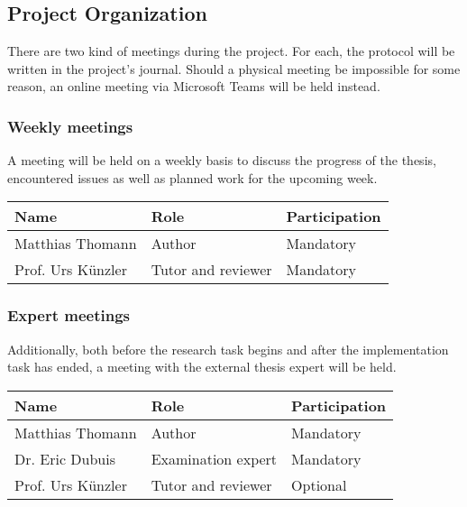 \subsection{Project Organization}
There are two kind of meetings during the project. For each, the protocol will be written in the project's journal.
Should a physical meeting be impossible for some reason, an online meeting via Microsoft Teams will be held instead.

\subsubsection{Weekly meetings}
A meeting will be held on a weekly basis to discuss the progress of the thesis, encountered issues as well as planned work for the upcoming week.
\emptyline
\noindent\begin{tabular}{|l|l|l|}
    \hline
    \textbf{Name}       & \textbf{Role}         & \textbf{Participation}\\ \hline
    Matthias Thomann    & Author                & Mandatory             \\ \hline
    Prof. Urs Künzler   & Tutor and reviewer    & Mandatory             \\ \hline
\end{tabular}

\clearpage

\subsubsection{Expert meetings}
Additionally, both before the research task begins and after the implementation task has ended, a meeting with the external thesis expert will be held.
\emptyline
\noindent\begin{tabular}{|l|l|l|}
    \hline
    \textbf{Name}       & \textbf{Role}         & \textbf{Participation}\\ \hline
    Matthias Thomann    & Author                & Mandatory             \\ \hline
    Dr. Eric Dubuis     & Examination expert    & Mandatory             \\ \hline
    Prof. Urs Künzler   & Tutor and reviewer    & Optional              \\ \hline
\end{tabular}
\emptyline


